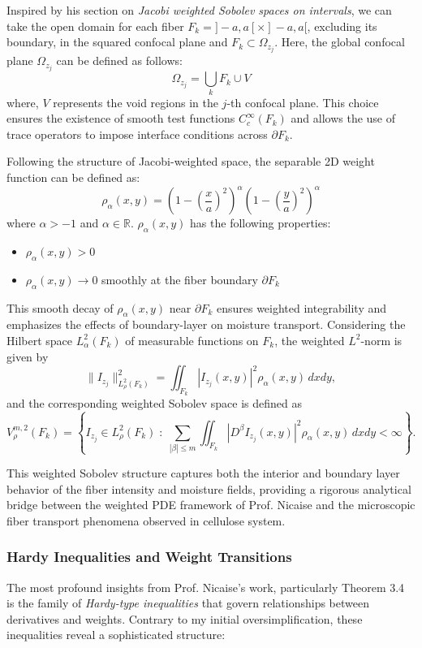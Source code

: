 \documentclass[11pt]{article}
\begin{document}
Inspired by his section on \textit{Jacobi weighted Sobolev spaces on intervals}, we can take the open domain for each fiber $F_k=]-a, a[ \times ]-a, a[$, excluding its boundary, in the squared confocal plane and $F_k\subset \Omega_{z_j}$. Here, the global confocal plane $\Omega_{z_j}$ can be defined as follows:
\[
\Omega_{z_j} = \bigcup_k F_k \cup V
\]
where, $V$ represents the void regions in the $j$-th confocal plane. This choice ensures the existence of smooth test functions $C_c^\infty(F_k)$ and allows the use of trace operators to impose interface conditions across $\partial F_k$.

Following the structure of Jacobi-weighted space, the separable 2D weight function can be defined as:
\[
\rho_\alpha(x, y) = \left(1-(\frac{x}{a})^2 \right)^\alpha \left(1-(\frac{y}{a})^2 \right)^\alpha
\]
where $\alpha >-1$ and $\alpha \in \mathbb{R}$. $\rho_\alpha(x, y)$ has the following properties:
\begin{itemize}
    \item $\rho_\alpha(x, y) > 0$
    \item $\rho_\alpha(x, y) \rightarrow 0$ smoothly at the fiber boundary $\partial F_k$
\end{itemize}
This smooth decay of $\rho_\alpha(x, y)$ near $\partial F_k$ ensures weighted integrability and emphasizes the effects of boundary-layer on moisture transport. 
Considering the Hilbert space $L_\alpha^2(F_k)$ of measurable functions on $F_k$, the weighted $L^2$-norm is given by
\[
\|I_{z_j}\|_{L^2_\rho(F_k)}^2 = 
\iint_{F_k} |I_{z_j}(x,y)|^2 \rho_\alpha(x,y) \, dxdy,
\]
and the corresponding weighted Sobolev space is defined as
\[
V^{m,2}_\rho(F_k)
=
\left\{ I_{z_j} \in L^2_\rho(F_k) \; : \;
\sum_{|\beta|\le m}
\iint_{F_k}
|D^\beta I_{z_j}(x,y)|^2
\rho_\alpha(x,y) \, dxdy < \infty
\right\}.
\]

This weighted Sobolev structure captures both the interior and boundary layer behavior of the fiber intensity and moisture fields, providing a rigorous analytical bridge between the weighted PDE framework of Prof. Nicaise and the microscopic fiber transport phenomena observed in cellulose system. 

\subsubsection{Hardy Inequalities and Weight Transitions}

The most profound insights from Prof. Nicaise's work, particularly Theorem 3.4 \cite{nicaise2000jacobi} is the family of \textit{Hardy-type inequalities} that govern relationships between derivatives and weights. Contrary to my initial oversimplification, these inequalities reveal a sophisticated structure:
\end{document}
